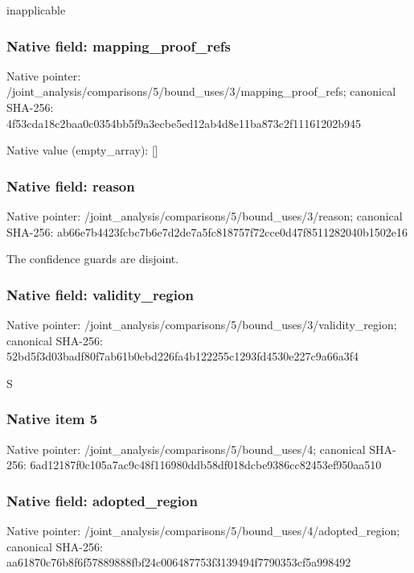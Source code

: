 \documentclass[10pt,a4paper]{article}
\begin{document}
\begingroup\raggedright\sloppy inapplicable\par\endgroup

\subsubsection{Native field: mapping\_\allowbreak{}proof\_\allowbreak{}refs}
Native pointer: /joint\_\allowbreak{}analysis/comparisons/5/bound\_\allowbreak{}uses/3/mapping\_\allowbreak{}proof\_\allowbreak{}refs; canonical SHA-256: 4f53cda18c2baa0c0354bb5f9a3ecbe5ed12ab4d8e11ba873c2f11161202b945

Native value (empty\_\allowbreak{}array): []

\subsubsection{Native field: reason}
Native pointer: /joint\_\allowbreak{}analysis/comparisons/5/bound\_\allowbreak{}uses/3/reason; canonical SHA-256: ab66e7b4423fcbc7b6e7d2de7a5fc818757f72cce0d47f8511282040b1502e16

\begingroup\raggedright\sloppy The confidence guards are disjoint.\par\endgroup

\subsubsection{Native field: validity\_\allowbreak{}region}
Native pointer: /joint\_\allowbreak{}analysis/comparisons/5/bound\_\allowbreak{}uses/3/validity\_\allowbreak{}region; canonical SHA-256: 52bd5f3d03badf80f7ab61b0ebd226fa4b122255c1293fd4530e227c9a66a3f4

\begingroup\raggedright\sloppy S\par\endgroup

\subsubsection{Native item 5}
Native pointer: /joint\_\allowbreak{}analysis/comparisons/5/bound\_\allowbreak{}uses/4; canonical SHA-256: 6ad12187f0c105a7ac9c48f116980ddb58df018dcbe9386cc82453ef950aa510

\subsubsection{Native field: adopted\_\allowbreak{}region}
Native pointer: /joint\_\allowbreak{}analysis/comparisons/5/bound\_\allowbreak{}uses/4/adopted\_\allowbreak{}region; canonical SHA-256: aa61870c76b8f6f57889888fbf24c006487753f3139494f7790353cf5a998492
\end{document}
